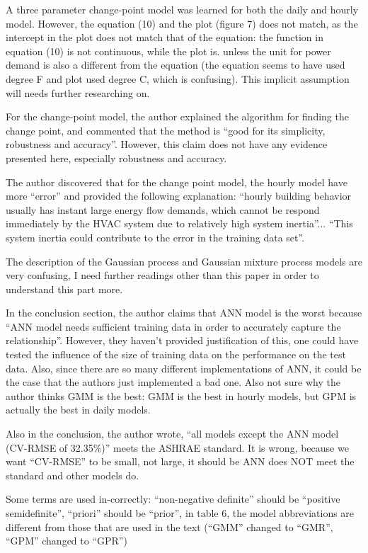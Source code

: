 \documentclass[12pt]{article}
\begin{document}
A three parameter change-point model was learned for both the daily
and hourly model. However, the equation (10) and the plot (figure 7)
does not match, as the intercept in the plot does not match that of
the equation: the function in equation (10) is not continuous, while
the plot is. unless the unit for power demand is also a different from
the equation (the equation seems to have used degree F and plot used
degree C, which is confusing). This implicit assumption will needs
further researching on.

For the change-point model, the author explained the algorithm for
finding the change point, and commented that the method is ``good for
its simplicity, robustness and accuracy''. However, this claim does
not have any evidence presented here, especially robustness and
accuracy.

The author discovered that for the change point model, the hourly
model have more ``error'' and provided the following explanation:
``hourly building behavior usually has instant large energy flow
demands, which cannot be respond immediately by the HVAC system due to
relatively high system inertia''... ``This system inertia could
contribute to the error in the training data set''.

The description of the Gaussian process and Gaussian mixture process
models are very confusing, I need further readings other than this
paper in order to understand this part more.

In the conclusion section, the author claims that ANN model is the
worst because ``ANN model needs sufficient training data in order to
accurately capture the relationship''. However, they haven't provided
justification of this, one could have tested the influence of the size
of training data on the performance on the test data. Also, since
there are so many different implementations of ANN, it could be the
case that the authors just implemented a bad one. Also not sure why
the author thinks GMM is the best: GMM is the best in hourly models,
but GPM is actually the best in daily models.

Also in the conclusion, the author wrote, ``all models except the ANN
model (CV-RMSE of 32.35\%)'' meets the ASHRAE standard. It is wrong,
because we want ``CV-RMSE'' to be small, not large, it should be ANN
does NOT meet the standard and other models do.

Some terms are used in-correctly: ``non-negative definite'' should be
``positive semidefinite'', ``priori'' should be ``prior'', in table 6,
the model abbreviations are different from those that are used in the
text (``GMM'' changed to ``GMR'', ``GPM'' changed to ``GPR'')
\end{document}
